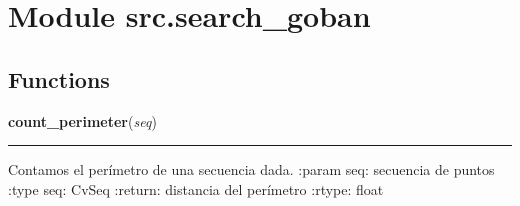 %
%
%


\section{Module src.search\_goban}

    \label{src:search_goban}


  \subsection{Functions}

    \label{src:search_goban:count_perimeter}

    \vspace{0.5ex}

\hspace{.8\funcindent}\begin{boxedminipage}{\funcwidth}

    \raggedright \textbf{count\_perimeter}(\textit{seq})

    \vspace{-1.5ex}

    \rule{\textwidth}{0.5\fboxrule}
\setlength{\parskip}{2ex}

Contamos el perímetro de una secuencia dada.
:param seq: secuencia de puntos
:type seq: CvSeq
:return: distancia del perímetro
:rtype: float
\setlength{\parskip}{1ex}
    \end{boxedminipage}

    \label{src:search_goban:get_corners}

    \vspace{0.5ex}

